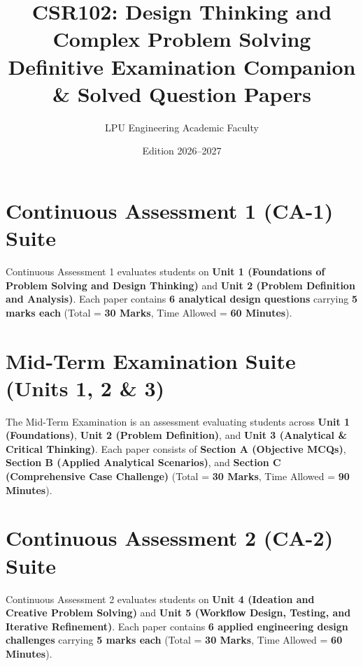 \documentclass[a4paper,11pt,oneside,openany]{book}
\title{CSR102: Design Thinking and Complex Problem Solving\\Definitive Examination Companion \& Solved Question Papers}
\author{LPU Engineering Academic Faculty}
\date{Edition 2026--2027}
\begin{document}
\frontmatter



\tableofcontents
\newpage

\mainmatter

\chapter{Continuous Assessment 1 (CA-1) Suite}
\label{chap:ca1}
\noindent
Continuous Assessment 1 evaluates students on \textbf{Unit 1 (Foundations of Problem Solving and Design Thinking)} and \textbf{Unit 2 (Problem Definition and Analysis)}. Each paper contains \textbf{6 analytical design questions} carrying \textbf{5 marks each} (Total = \textbf{30 Marks}, Time Allowed = \textbf{60 Minutes}).

\newpage



\chapter{Mid-Term Examination Suite (Units 1, 2 \& 3)}
\label{chap:midterm}
\noindent
The Mid-Term Examination is an assessment evaluating students across \textbf{Unit 1 (Foundations)}, \textbf{Unit 2 (Problem Definition)}, and \textbf{Unit 3 (Analytical \& Critical Thinking)}. Each paper consists of \textbf{Section A (Objective MCQs)}, \textbf{Section B (Applied Analytical Scenarios)}, and \textbf{Section C (Comprehensive Case Challenge)} (Total = \textbf{30 Marks}, Time Allowed = \textbf{90 Minutes}).

\newpage



\chapter{Continuous Assessment 2 (CA-2) Suite}
\label{chap:ca2}
\noindent
Continuous Assessment 2 evaluates students on \textbf{Unit 4 (Ideation and Creative Problem Solving)} and \textbf{Unit 5 (Workflow Design, Testing, and Iterative Refinement)}. Each paper contains \textbf{6 applied engineering design challenges} carrying \textbf{5 marks each} (Total = \textbf{30 Marks}, Time Allowed = \textbf{60 Minutes}).
\end{document}
